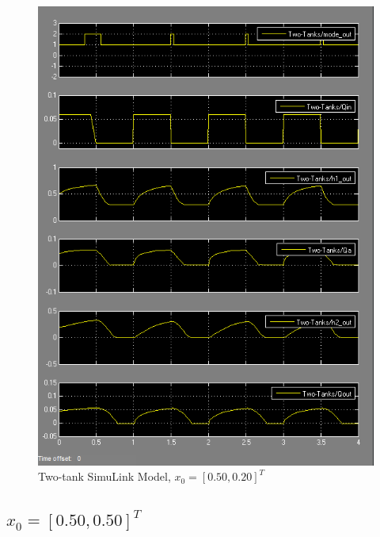 \documentclass{article}
\begin{document}
\begin{figure}[h!]
\centering
\includegraphics[scale=0.7]{hw8_50_20.png}
\caption{Two-tank SimuLink Model, $x_0 = [0.50, 0.20]^T$ }
\label{fig:two-tank-model-50-20}
\end{figure}

\subsection{$x_0 = [0.50, 0.50]^T$}
\end{document}
